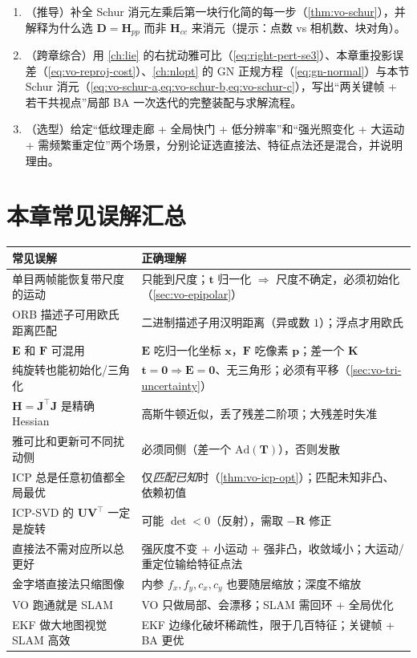 \begin{practice}
\begin{enumerate}
  \item （推导）补全 Schur 消元左乘后第一块行化简的每一步（\cref{thm:vo-schur}），并解释为什么选 $\mathbf{D}=\mathbf{H}_{pp}$ 而非 $\mathbf{H}_{cc}$ 来消元（提示：点数 vs 相机数、块对角）。
  \item （跨章综合）用 \cref{ch:lie} 的右扰动雅可比（\cref{eq:right-pert-se3}）、本章重投影误差（\cref{eq:vo-reproj-cost}）、\cref{ch:nlopt} 的 GN 正规方程（\cref{eq:gn-normal}）与本节 Schur 消元（\cref{eq:vo-schur-a,eq:vo-schur-b,eq:vo-schur-c}），写出“两关键帧 + 若干共视点”局部 BA 一次迭代的完整装配与求解流程。
  \item （选型）给定“低纹理走廊 + 全局快门 + 低分辨率”和“强光照变化 + 大运动 + 需频繁重定位”两个场景，分别论证选直接法、特征点法还是混合，并说明理由。
\end{enumerate}
\end{practice}

\section*{本章常见误解汇总}
\begin{table}[H]\centering\small
\begin{tabular}{p{} p{}}
\toprule
\textbf{常见误解} & \textbf{正确理解} \\
\midrule
单目两帧能恢复带尺度的运动 & 只能到尺度；$\mathbf{t}$ 归一化 $\Rightarrow$ 尺度不确定，必须初始化（\cref{sec:vo-epipolar}）\\
ORB 描述子可用欧氏距离匹配 & 二进制描述子用汉明距离（异或数 $1$）；浮点才用欧氏 \\
$\mathbf{E}$ 和 $\mathbf{F}$ 可混用 & $\mathbf{E}$ 吃归一化坐标 $\mathbf{x}$，$\mathbf{F}$ 吃像素 $\mathbf{p}$；差一个 $\mathbf{K}$ \\
纯旋转也能初始化/三角化 & $\mathbf{t}=\mathbf{0}\Rightarrow\mathbf{E}=\mathbf{0}$、无三角形；必须有平移（\cref{sec:vo-tri-uncertainty}）\\
$\mathbf{H}=\mathbf{J}^\top\mathbf{J}$ 是精确 Hessian & 高斯牛顿近似，丢了残差二阶项；大残差时失准 \\
雅可比和更新可不同扰动侧 & 必须同侧（差一个 $\mathrm{Ad}(\mathbf{T})$），否则发散 \\
ICP 总是任意初值都全局最优 & 仅\emph{匹配已知}时（\cref{thm:vo-icp-opt}）；匹配未知非凸、依赖初值 \\
ICP-SVD 的 $\mathbf{U}\mathbf{V}^\top$ 一定是旋转 & 可能 $\det<0$（反射），需取 $-\mathbf{R}$ 修正 \\
直接法不需对应所以总更好 & 强灰度不变 + 小运动 + 强非凸，收敛域小；大运动/重定位输给特征点法 \\
金字塔直接法只缩图像 & 内参 $f_x,f_y,c_x,c_y$ 也要随层缩放；深度不缩放 \\
VO 跑通就是 SLAM & VO 只做局部、会漂移；SLAM 需回环 + 全局优化 \\
EKF 做大地图视觉 SLAM 高效 & EKF 边缘化破坏稀疏性，限于几百特征；关键帧 + BA 更优 \\
\bottomrule
\end{tabular}
\end{table}

